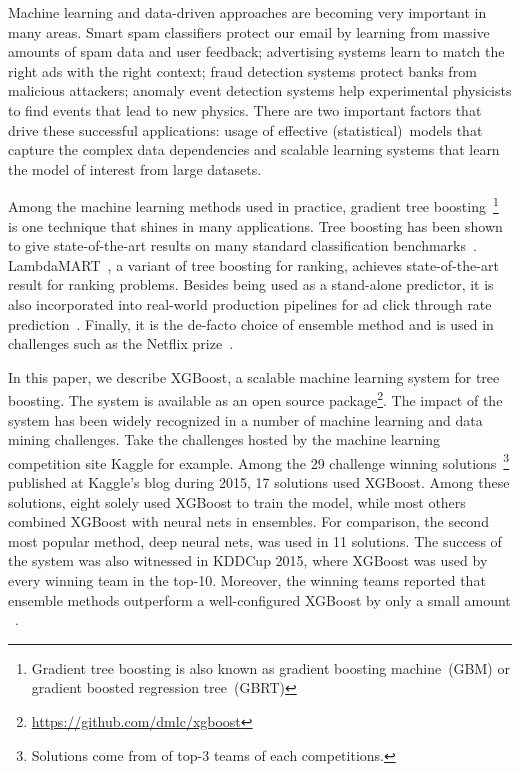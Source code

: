 \documentclass{sig-alternate-05-2015}
\begin{document}
Machine learning and data-driven approaches are becoming very important in many areas. Smart spam classifiers protect our email by learning from massive amounts of spam data and user feedback;
advertising systems learn to match the right ads with the right context;
fraud detection systems protect banks from malicious attackers; anomaly event detection systems help experimental physicists to find events that  lead to new physics.  There are two important factors that drive these successful applications: usage of effective (statistical)~models that capture the complex data dependencies and scalable learning systems that learn the model of interest from large datasets.

Among the machine learning methods used in practice, gradient tree boosting~\cite{friedman2001greedy}\footnote{Gradient tree boosting is also known as gradient boosting machine~(GBM) or gradient boosted regression tree~(GBRT)} is one technique that shines in many applications.
Tree boosting has been shown to give state-of-the-art results on many standard classification benchmarks~\cite{Li10}.
LambdaMART~\cite{burges2010ranknet}, a variant of tree boosting for ranking, achieves state-of-the-art result for  ranking problems. Besides being used as a stand-alone predictor, it is also incorporated into real-world production pipelines for ad click through rate prediction~\cite{He:AdKDD}. Finally, it is the de-facto choice of ensemble method and is used in challenges such as the Netflix prize~\cite{bennett2007netflix}.

In this paper, we describe XGBoost, a scalable machine learning system for tree boosting. The system is available as an open source package\footnote{\url{https://github.com/dmlc/xgboost}}.
The impact of the system has been widely recognized in a number of machine learning and data mining challenges.
Take the challenges hosted by the machine learning competition site Kaggle for example.  Among the 29 challenge winning solutions~\footnote{Solutions come from of top-3 teams of each competitions.} published at Kaggle's blog during 2015, 17 solutions used XGBoost.  Among these solutions, eight solely used XGBoost to train the model, while most others combined XGBoost with neural nets in ensembles.
For comparison, the second most popular method, deep neural nets, was used in 11 solutions.
The success of the system was also witnessed in KDDCup 2015, where XGBoost was used by every winning team in the top-10.
Moreover, the winning teams reported that ensemble methods outperform a well-configured XGBoost by only a small amount ~\cite{Bekkerman:KDDCup}.
\end{document}
